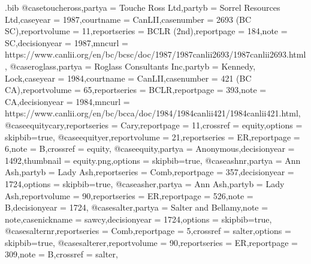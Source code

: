 \begin{filecontents*}[overwrite]{\jobname.bib}
@case{toucheross,partya = {Touche Ross Ltd},partyb = {Sorrel Resources Ltd},caseyear = {1987},courtname = {CanLII},casenumber = {2693 (BC SC)},reportvolume = {11},reportseries = {BCLR (2nd)},reportpage = {184},note = {SC},decisionyear = {1987},mncurl = {https://www.canlii.org/en/bc/bcsc/doc/1987/1987canlii2693/1987canlii2693.html},}
@case{roglass,partya = {Roglass Consultants Inc},partyb = {Kennedy, Lock},caseyear = {1984},courtname = {CanLII},casenumber = {421 (BC CA)},reportvolume = {65},reportseries = {BCLR},reportpage = {393},note = {CA},decisionyear = {1984},mncurl = {https://www.canlii.org/en/bc/bcca/doc/1984/1984canlii421/1984canlii421.html},}
@case{equitycary,reportseries = {Cary},reportpage = {11},crossref = {equity},options = {skipbib=true},}
@case{equityer,reportvolume = {21},reportseries = {ER},reportpage = {6},note = {B},crossref = {equity},}
@case{equity,partya = {Anonymous},decisionyear = {1492},thumbnail = {equity.png},options = {skipbib=true},}
@case{ashnr,partya = {Ann Ash},partyb = {Lady Ash},reportseries = {Comb},reportpage = {357},decisionyear = {1724},options = {skipbib=true},}
@case{asher,partya = {Ann Ash},partyb = {Lady Ash},reportvolume = {90},reportseries = {ER},reportpage = {526},note = {B},decisionyear = {1724},}
@case{salter,partya = {Salter and Bellamy},note = {note},casenickname = {sawcy},decisionyear = {1724},options = {skipbib=true},}
@case{salternr,reportseries = {Comb},reportpage = {5},crossref = {salter},options = {skipbib=true},}
@case{salterer,reportvolume = {90},reportseries = {ER},reportpage = {309},note = {B},crossref = {salter},}


\end{filecontents*}
